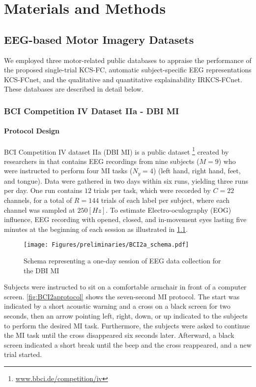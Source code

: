 \chapter{Materials and Methods}


\section{EEG-based Motor Imagery Datasets}\label{sec:dataset}

We employed three motor-related public databases to appraise the performance of the proposed single-trial KCS-FC, automatic subject-specific EEG representations KCS-FCnet, and the qualitative and quantitative explainability IRKCS-FCnet. These databases are described in detail below.

\subsection{BCI Competition IV Dataset IIa - DBI MI}

\subsubsection{Protocol Design}

BCI Competition IV dataset IIa (DBI MI) is a public dataset \footnote{\url{www.bbci.de/competition/iv}} created by researchers in \cite{brunner2008bci} that contains EEG recordings from nine subjects ($M=9$) who were instructed to perform four MI tasks ($N_y=4$) (left hand, right hand, feet, and tongue). Data were gathered in two days within six runs, yielding three runs per day. One run contains $12$ trials per task, which were recorded by $C=22$ channels, for a total of $R=144$ trials of each label per subject, where each channel was sampled at $250 [Hz]$. To estimate Electro-oculography (EOG) influence, EEG recording with opened, closed, and in-movement eyes lasting five minutes at the beginning of each session as illustrated in \cref{fig:bci2a_schema}.

\begin{figure}[!h]
  \centering
  \texttt{[image: Figures/preliminaries/BCI2a\_schema.pdf]}
  \caption{Schema representing a one-day session of EEG data collection for the DBI MI \label{fig:bci2a_schema}}
\end{figure}

Subjects were instructed to sit on a comfortable armchair in front of a computer screen. \cref{fig:BCI2aprotocol} shows the seven-second MI protocol. The start was indicated by a short acoustic warning and a cross on a black screen for two seconds, then an arrow pointing left, right, down, or up indicated to the subjects to perform the desired MI task. Furthermore, the subjects were asked to continue the MI task until the cross disappeared six seconds later. Afterward, a black screen indicated a short break until the beep and the cross reappeared, and a new trial started.

